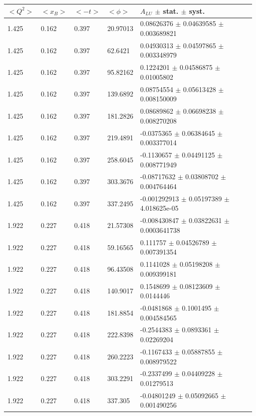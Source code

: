 \begin{table}[!h]
   \begin{center}
      \begin{tabular}{||l|l|l|l|l||}
         \hline
 $<Q^{2}>$ & $<x_{B}>$ & $<-t>$ & $<\phi>$ & $A_{LU}$ $\pm$ stat. $\pm$ syst.\\
         \hline 
 1.425 & 0.162 & 0.397 & 20.97013 & 0.08626376   $\pm$   0.04639585  $\pm$ 
0.003689821  \\
 1.425 & 0.162 & 0.397 & 62.6421  &0.04930313    $\pm$   0.04597865  $\pm$ 0.003348979  \\
 1.425 & 0.162 & 0.397 & 95.82162 & 0.1224201    $\pm$   0.04586875  $\pm$ 0.01005802   \\
 1.425 & 0.162 & 0.397 & 139.6892 & 0.08754554   $\pm$   0.05613428  $\pm$ 0.008150009  \\
 1.425 & 0.162 & 0.397 & 181.2826 & 0.08689862   $\pm$   0.06698238  $\pm$ 0.008270208  \\
 1.425 & 0.162 & 0.397 & 219.4891 & -0.0375365   $\pm$   0.06384645  $\pm$ 0.003377014  \\
 1.425 & 0.162 & 0.397 & 258.6045 & -0.1130657   $\pm$   0.04491125  $\pm$ 0.008771949  \\
 1.425 & 0.162 & 0.397 & 303.3676 & -0.08717632  $\pm$   0.03808702  $\pm$ 0.004764464  \\
 1.425 & 0.162 & 0.397 & 337.2495 & -0.001292913 $\pm$   0.05197389  $\pm$ 4.018625e-05 \\
   
         \hline
  1.922 & 0.227 & 0.418 & 21.57308 & -0.008430847 $\pm$  0.03822631  $\pm$ 
0.0003641738  \\
  1.922 & 0.227 & 0.418 & 59.16565 & 0.111757     $\pm$  0.04526789  $\pm$ 0.007391354   \\
  1.922 & 0.227 & 0.418 & 96.43508 & 0.1141028    $\pm$  0.05198208  $\pm$ 0.009399181   \\
  1.922 & 0.227 & 0.418 & 140.9017 & 0.1548699    $\pm$  0.08123609  $\pm$ 0.0144446     \\
  1.922 & 0.227 & 0.418 & 181.8854 & -0.0481868   $\pm$  0.1001495   $\pm$ 0.004584565   \\
  1.922 & 0.227 & 0.418 & 222.8398 & -0.2544383   $\pm$  0.0893361   $\pm$ 0.02269204    \\
  1.922 & 0.227 & 0.418 & 260.2223 & -0.1167433   $\pm$  0.05887855  $\pm$ 0.008979522   \\
  1.922 & 0.227 & 0.418 & 303.2291 & -0.2337499   $\pm$  0.04409228  $\pm$ 0.01279513    \\
  1.922 & 0.227 & 0.418 & 337.305  &-0.04801249   $\pm$  0.05092665  $\pm$ 0.001490256   \\
   


\end{tabular}
\end{center}
\end{table}
